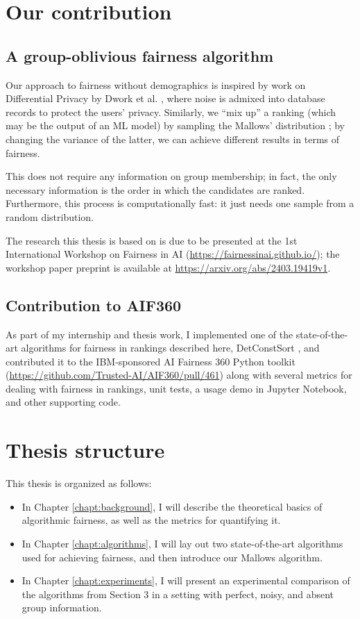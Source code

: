 \section{Our contribution}\label{sect:int_4}

\subsection{A group-oblivious fairness algorithm}

Our approach to fairness without demographics is inspired by work on Differential Privacy by Dwork et al. \cite{foundationsofDPDwork}, where noise is admixed into database records to protect the users’ privacy. Similarly, we “mix up” a ranking (which may be the output of an ML model) by sampling the Mallows’ distribution \cite{mallows}; by changing the variance of the latter, we can achieve different results in terms of fairness.

This does not require any information on group membership; in fact, the only necessary information is the order in which the candidates are ranked. Furthermore, this process is computationally fast: it just needs one sample from a random distribution.

The research this thesis is based on is due to be presented at the 1st International Workshop on Fairness in AI (\url{https://fairnessinai.github.io/}); the workshop paper preprint is available at \url{https://arxiv.org/abs/2403.19419v1}.

\subsection{Contribution to AIF360}

As part of my internship and thesis work, I implemented one of the state-of-the-art algorithms for fairness in rankings described here, DetConstSort \cite{linkedin}, and contributed it to the IBM-sponsored AI Fairness 360 Python toolkit (\url{https://github.com/Trusted-AI/AIF360/pull/461}) along with several metrics for dealing with fairness in rankings, unit tests, a usage demo in Jupyter Notebook, and other supporting code.

\section{Thesis structure}\label{sect:structure}

This thesis is organized as follows:

\begin{itemize}
\item In Chapter \ref{chapt:background}, I will describe the theoretical basics of algorithmic fairness, as well as the metrics for quantifying it.
\item In Chapter \ref{chapt:algorithms}, I will lay out two state-of-the-art algorithms used for achieving fairness, and then introduce our Mallows algorithm.
\item In Chapter \ref{chapt:experiments}, I will present an experimental comparison of the algorithms from Section 3 in a setting with perfect, noisy, and absent group information.
\end{itemize}


